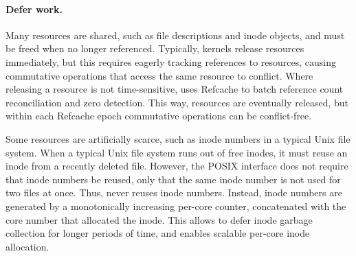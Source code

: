 

\paragraph{Defer work.} Many \fs resources are shared,
such as file descriptions and inode objects, and must be freed when no
longer referenced.
Typically, kernels release resources immediately, but this requires
eagerly tracking references to resources, causing
commutative operations that access the same resource to conflict.  Where
releasing a resource is not time-sensitive, \fs
uses Refcache to batch reference count
reconciliation and zero detection.  This way, resources are eventually
released, but within each Refcache epoch commutative operations can be
conflict-free.



Some resources are artificially scarce, such as inode numbers in a typical
Unix file system.  When a typical Unix file system runs out of free
inodes, it must reuse an inode from a recently deleted file.  However,
the POSIX interface does not require that inode numbers be reused, only
that the same inode number is not used for two files at once.  Thus,
\fs never reuses inode numbers.  Instead, inode numbers are
generated by a monotonically increasing per-core counter, concatenated
with the core number that allocated the inode.  This allows \fs to defer
inode garbage collection for longer periods of time, and enables scalable
per-core inode allocation.



